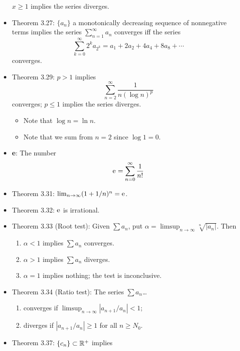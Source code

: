 \documentclass[../../notes.tex]{subfiles}
\begin{document}
\begin{itemize}
    $x\geq 1$ implies the series diverges.
    \item Theorem 3.27: $\{a_n\}$ a monotonically decreasing sequence of nonnegative terms implies the series $\sum_{n=1}^\infty a_n$ converges iff the series
    \begin{equation*}
        \sum_{k=0}^\infty 2^ka_{2^k} = a_1+2a_2+4a_4+8a_8+\cdots
    \end{equation*}
    converges.
    \item Theorem 3.29: $p>1$ implies
    \begin{equation*}
        \sum_{n=2}^\infty\frac{1}{n(\log n)^p}
    \end{equation*}
    converges; $p\leq 1$ implies the series diverges.
    \begin{itemize}
        \item Note that $\log n=\ln n$.
        \item Note that we sum from $n=2$ since $\log 1=0$.
    \end{itemize}
    \item \textbf{e}: The number
    \begin{equation*}
        \text{e}^{} = \sum_{n=0}^\infty\frac{1}{n!}
    \end{equation*}
    \item Theorem 3.31: $\lim_{n\to\infty}(1+1/n)^n=\text{e}^{}$.
    \item Theorem 3.32: $\text{e}^{}$ is irrational.
    \item Theorem 3.33 (Root test): Given $\sum a_n$, put $\alpha=\limsup_{n\to\infty}\sqrt[n]{|a_n|}$. Then
    \begin{enumerate}[label={(\alph*)}]
        \item $\alpha<1$ implies $\sum a_n$ converges.
        \item $\alpha>1$ implies $\sum a_n$ diverges.
        \item $\alpha=1$ implies nothing; the test is inconclusive.
    \end{enumerate}
    \item Theorem 3.34 (Ratio test): The series $\sum a_n$\dots
    \begin{enumerate}[label={(\alph*)}]
        \item converges if $\limsup_{n\to\infty}|a_{n+1}/a_n|<1$;
        \item diverges if $|a_{n+1}/a_n|\geq 1$ for all $n\geq N_0$.
    \end{enumerate}
    \item Theorem 3.37: $\{c_n\}\subset\mathbb{R}^+$ implies

\end{itemize}
\end{document}
